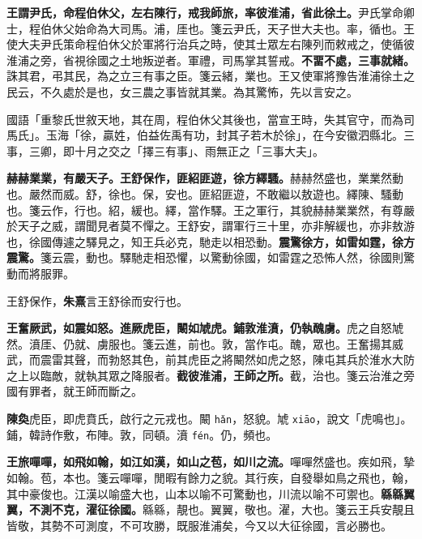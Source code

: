 \textbf{王謂尹氏，命程伯休父，左右陳行，戒我師旅，率彼淮浦，省此徐土。}{\footnotesize 尹氏掌命卿士，程伯休父始命為大司馬。浦，厓也。箋云尹氏，天子世大夫也。率，循也。王使大夫尹氏策命程伯休父於軍將行治兵之時，使其士眾左右陳列而敕戒之，使循彼淮浦之旁，省視徐國之土地叛逆者。軍禮，司馬掌其誓戒。}\textbf{不畱不處，三事就緒。}{\footnotesize 誅其君，弔其民，為之立三有事之臣。箋云緒，業也。王又使軍將豫告淮浦徐土之民云，不久處於是也，女三農之事皆就其業。為其驚怖，先以言安之。}

\begin{quoting}國語「重黎氏世敘天地，其在周，程伯休父其後也，當宣王時，失其官守，而為司馬氏」。玉海「徐，贏姓，伯益佐禹有功，封其子若木於徐」，在今安徽泗縣北。三事，三卿，即十月之交之「擇三有事」、雨無正之「三事大夫」。\end{quoting}

\textbf{赫赫業業，有嚴天子。王舒保作，匪紹匪遊，徐方繹騷。}{\footnotesize 赫赫然盛也，業業然動也。嚴然而威。舒，徐也。保，安也。匪紹匪遊，不敢繼以敖遊也。繹陳、騷動也。箋云作，行也。紹，緩也。繹，當作驛。王之軍行，其貌赫赫業業然，有尊嚴於天子之威，謂聞見者莫不憚之。王舒安，謂軍行三十里，亦非解緩也，亦非敖游也，徐國傳遽之驛見之，知王兵必克，馳走以相恐動。}\textbf{震驚徐方，如雷如霆，徐方震驚。}{\footnotesize 箋云震，動也。驛馳走相恐懼，以驚動徐國，如雷霆之恐怖人然，徐國則驚動而將服罪。}

\begin{quoting}王舒保作，\textbf{朱熹}言王舒徐而安行也。\end{quoting}

\textbf{王奮厥武，如震如怒。進厥虎臣，闞如虓虎。鋪敦淮濆，仍執醜虜。}{\footnotesize 虎之自怒虓然。濆厓、仍就、虜服也。箋云進，前也。敦，當作屯。醜，眾也。王奮揚其威武，而震雷其聲，而勃怒其色，前其虎臣之將闞然如虎之怒，陳屯其兵於淮水大防之上以臨敵，就執其眾之降服者。}\textbf{截彼淮浦，王師之所。}{\footnotesize 截，治也。箋云治淮之旁國有罪者，就王師而斷之。}

\begin{quoting}\textbf{陳奐}虎臣，即虎賁氏，啟行之元戎也。闞 \texttt{hǎn}，怒貌。虓 \texttt{xiāo}，說文「虎鳴也」。鋪，韓詩作敷，布陣。敦，同頓。濆 \texttt{fén}。仍，頻也。\end{quoting}

\textbf{王旅嘽嘽，如飛如翰，如江如漢，如山之苞，如川之流。}{\footnotesize 嘽嘽然盛也。疾如飛，摯如翰。苞，本也。箋云嘽嘽，閒暇有餘力之貌。其行疾，自發舉如鳥之飛也，翰，其中豪俊也。江漢以喻盛大也，山本以喻不可驚動也，川流以喻不可禦也。}\textbf{緜緜翼翼，不測不克，濯征徐國。}{\footnotesize 緜緜，靚也。翼翼，敬也。濯，大也。箋云王兵安靚且皆敬，其勢不可測度，不可攻勝，既服淮浦矣，今又以大征徐國，言必勝也。}

